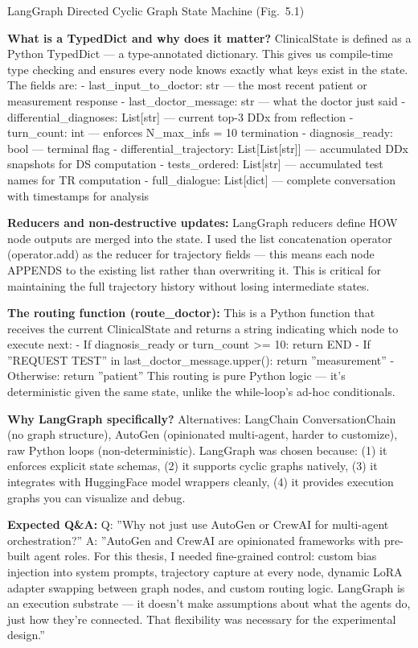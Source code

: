 \documentclass[aspectratio=169,11pt]{beamer}
\begin{document}
\begin{frame}{LangGraph Directed Cyclic Graph State Machine (Fig.\ 5.1)}
{\textbf{What is a TypedDict and why does it matter?}
ClinicalState is defined as a Python TypedDict — a type-annotated dictionary. This gives us compile-time type checking and ensures every node knows exactly what keys exist in the state. The fields are:
- last\_input\_to\_doctor: str — the most recent patient or measurement response
- last\_doctor\_message: str — what the doctor just said
- differential\_diagnoses: List[str] — current top-3 DDx from reflection
- turn\_count: int — enforces N\_max\_infs = 10 termination
- diagnosis\_ready: bool — terminal flag
- differential\_trajectory: List[List[str]] — accumulated DDx snapshots for DS computation
- tests\_ordered: List[str] — accumulated test names for TR computation
- full\_dialogue: List[dict] — complete conversation with timestamps for analysis

\textbf{Reducers and non-destructive updates:} LangGraph reducers define HOW node outputs are merged into the state. I used the list concatenation operator (operator.add) as the reducer for trajectory fields — this means each node APPENDS to the existing list rather than overwriting it. This is critical for maintaining the full trajectory history without losing intermediate states.

\textbf{The routing function (route\_doctor):} This is a Python function that receives the current ClinicalState and returns a string indicating which node to execute next:
- If diagnosis\_ready or turn\_count >= 10: return END
- If ''REQUEST TEST'' in last\_doctor\_message.upper(): return ''measurement''
- Otherwise: return ''patient''
This routing is pure Python logic — it's deterministic given the same state, unlike the while-loop's ad-hoc conditionals.

\textbf{Why LangGraph specifically?}
Alternatives: LangChain ConversationChain (no graph structure), AutoGen (opinionated multi-agent, harder to customize), raw Python loops (non-deterministic). LangGraph was chosen because: (1) it enforces explicit state schemas, (2) it supports cyclic graphs natively, (3) it integrates with HuggingFace model wrappers cleanly, (4) it provides execution graphs you can visualize and debug.

\textbf{Expected Q\&A:}
Q: ''Why not just use AutoGen or CrewAI for multi-agent orchestration?''
A: ''AutoGen and CrewAI are opinionated frameworks with pre-built agent roles. For this thesis, I needed fine-grained control: custom bias injection into system prompts, trajectory capture at every node, dynamic LoRA adapter swapping between graph nodes, and custom routing logic. LangGraph is an execution substrate — it doesn't make assumptions about what the agents do, just how they're connected. That flexibility was necessary for the experimental design.''

}
\end{frame}
\end{document}
